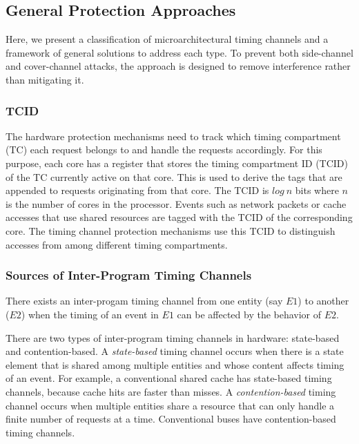 \subsection{General Protection Approaches}
\label{sec:general_approaches}

Here, we present a classification of microarchitectural timing 
channels and a framework of general solutions to address each type.
To prevent both side-channel and cover-channel attacks,
the approach is designed to remove interference rather than mitigating it.

\subsubsection{TCID}

The hardware protection mechanisms need to track which timing compartment (TC)
each request belongs to and handle the requests accordingly. 
For this purpose, each core has a register that 
stores the timing compartment ID (TCID) of the TC currently active on that 
core. This is used to derive the tags that are appended to requests originating 
from that core. The TCID is $log\ n$ bits where $n$ is the number of cores in 
the processor.
Events such as network packets or cache accesses that use shared resources are 
tagged with the TCID of the corresponding core.  The timing channel protection 
mechanisms use this TCID to distinguish accesses
from among different timing compartments.

\subsubsection{Sources of Inter-Program Timing Channels}

There exists an inter-progam timing channel from one entity (say $E1$)
to another ($E2$) when the timing of an event in $E1$ can be affected by 
the behavior of $E2$.

There are two types of inter-program timing channels in hardware: state-based
and contention-based.
A \emph{state-based} timing channel occurs when there is a state element 
that is shared among multiple entities and whose
content affects timing of an event.
For example, a conventional shared cache has state-based timing channels, 
because cache hits are faster than misses.
A \emph{contention-based} timing channel occurs when multiple entities 
share a resource that can only handle a finite number of requests at a time.
Conventional buses have contention-based timing channels.

